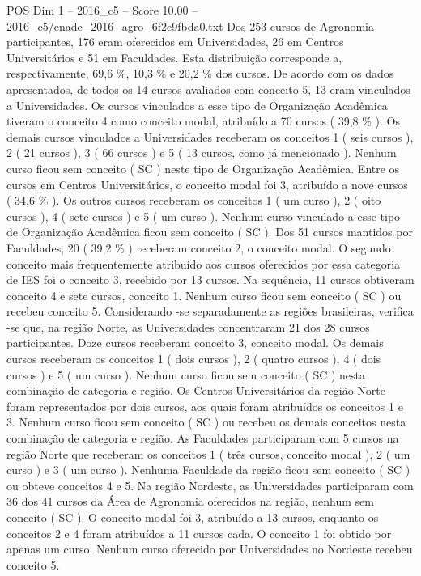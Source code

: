 \begin{textsample}{POS Dim 1 – 2016\_c5 – Score 10.00 – 2016\_c5/enade\_2016\_agro\_6f2e9fbda0.txt}
Dos 253 cursos de Agronomia participantes, 176 eram oferecidos em Universidades, 26 em Centros Universitários e 51 em Faculdades.
Esta distribuição corresponde a, respectivamente, 69,6 \%, 10,3 \% e 20,2 \% dos cursos.
De acordo com os dados apresentados, de todos os 14 cursos avaliados com conceito 5, 13 eram vinculados a Universidades.
Os cursos vinculados a esse tipo de Organização Acadêmica tiveram o conceito 4 como conceito modal, atribuído a 70 cursos ( 39,8 \% ).
Os demais cursos vinculados a Universidades receberam os conceitos 1 ( seis cursos ), 2 ( 21 cursos ), 3 ( 66 cursos ) e 5 ( 13 cursos, como já mencionado ).
Nenhum curso ficou sem conceito ( SC ) neste tipo de Organização Acadêmica.
Entre os cursos em Centros Universitários, o conceito modal foi 3, atribuído a nove cursos ( 34,6 \% ).
Os outros cursos receberam os conceitos 1 ( um curso ), 2 ( oito cursos ), 4 ( sete cursos ) e 5 ( um curso ).
Nenhum curso vinculado a esse tipo de Organização Acadêmica ficou sem conceito ( SC ).
Dos 51 cursos mantidos por Faculdades, 20 ( 39,2 \% ) receberam conceito 2, o conceito modal.
O segundo conceito mais frequentemente atribuído aos cursos oferecidos por essa categoria de IES foi o conceito 3, recebido por 13 cursos.
Na sequência, 11 cursos obtiveram conceito 4 e sete cursos, conceito 1.
Nenhum curso ficou sem conceito ( SC ) ou recebeu conceito 5.
Considerando -se separadamente as regiões brasileiras, verifica -se que, na região Norte, as Universidades concentraram 21 dos 28 cursos participantes.
Doze cursos receberam conceito 3, conceito modal.
Os demais cursos receberam os conceitos 1 ( dois cursos ), 2 ( quatro cursos ), 4 ( dois cursos ) e 5 ( um curso ).
Nenhum curso ficou sem conceito ( SC ) nesta combinação de categoria e região.
Os Centros Universitários da região Norte foram representados por dois cursos, aos quais foram atribuídos os conceitos 1 e 3.
Nenhum curso ficou sem conceito ( SC ) ou recebeu os demais conceitos nesta combinação de categoria e região.
As Faculdades participaram com 5 cursos na região Norte que receberam os conceitos 1 ( três cursos, conceito modal ), 2 ( um curso ) e 3 ( um curso ).
Nenhuma Faculdade da região ficou sem conceito ( SC ) ou obteve conceitos 4 e 5.
Na região Nordeste, as Universidades participaram com 36 dos 41 cursos da Área de Agronomia oferecidos na região, nenhum sem conceito ( SC ).
O conceito modal foi 3, atribuído a 13 cursos, enquanto os conceitos 2 e 4 foram atribuídos a 11 cursos cada.
O conceito 1 foi obtido por apenas um curso.
Nenhum curso oferecido por Universidades no Nordeste recebeu conceito 5.

\end{textsample}
